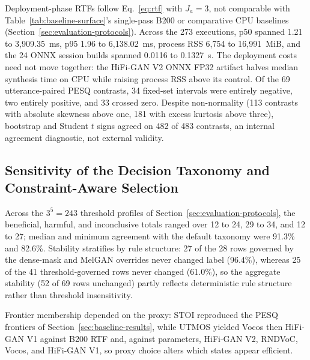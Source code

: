 Deployment-phase RTFs follow Eq.~\eqref{eq:rtf} with $J_a{=}3$, not
comparable with Table~\ref{tab:baseline-surface}'s single-pass B200 or
comparative CPU baselines (Section~\ref{sec:evaluation-protocols}).  Across the 273 executions, p50 spanned
1.21 to 3{,}909.35~ms, p95 1.96 to 6{,}138.02~ms, process RSS 6{,}754 to
16{,}991~MiB, and the 24 ONNX session builds spanned 0.0116 to 0.1327~s.  The
deployment costs need not move together: the HiFi-GAN V2 ONNX FP32
artifact halves median synthesis time on CPU while raising process RSS
above its control.  Of the 69 utterance-paired PESQ contrasts, 34 fixed-set intervals were
entirely negative, two entirely positive, and 33 crossed zero.  Despite
non-normality (113 contrasts with absolute skewness above one, 181 with
excess kurtosis above three), bootstrap and Student $t$ signs agreed on
482 of 483 contrasts, an internal agreement diagnostic, not external
validity.

\subsection{Sensitivity of the Decision Taxonomy and Constraint-Aware
Selection}
\label{sec:selection-results}

Across the $3^5=243$ threshold profiles of
Section~\ref{sec:evaluation-protocols}, the beneficial,
harmful, and inconclusive totals ranged over 12 to 24, 29 to 34, and 12 to
27; median and minimum agreement with the default taxonomy were 91.3\%
and 82.6\%.  Stability stratifies by rule structure: 27 of the 28 rows
governed by the dense-mask and MelGAN overrides never changed label
(96.4\%), whereas 25 of the 41 threshold-governed rows never changed
(61.0\%), so the aggregate stability (52 of 69 rows unchanged) partly
reflects deterministic rule structure rather than threshold insensitivity.

Frontier membership depended on the proxy: STOI reproduced the
PESQ frontiers of Section~\ref{sec:baseline-results}, while UTMOS yielded
Vocos then HiFi-GAN V1 against B200 RTF and, against parameters, HiFi-GAN
V2, RNDVoC, Vocos, and HiFi-GAN V1, so proxy choice alters which states appear
efficient.

\begin{table}[t]
  \centering
  \footnotesize
  \renewcommand{\arraystretch}{1.02}
  \caption{Constraint-aware selection (Eq.~\eqref{eq:constrained-selection})
  over all admitted artifacts per lane, with same-lane controls:
  feasible-set size and RTF-minimizing artifact per constraint vector
  (deployment-phase PESQ floor, parameter ceiling, size ceiling).  RTF
  values follow the deployment-phase three-repetition estimand (not
  comparable with Table~\ref{tab:baseline-surface}).}
  \label{tab:joint-selector}
\end{table}


